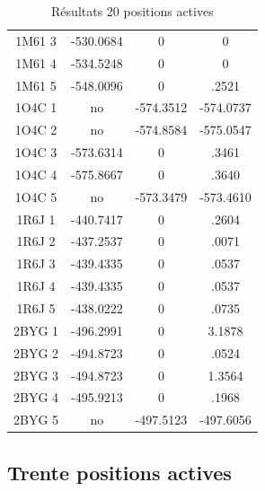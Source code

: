 \documentclass[a4paper,12pt]{article}
\begin{document}
\begin{table}[h]
\begin{tabular}{|c|c|c|c|}
        1M61 3 & -530.0684 & 0 & 0 \\
        1M61 4 & -534.5248 & 0 & 0 \\
        1M61 5 & -548.0096 & 0 & .2521 \\
        1O4C 1 & no & -574.3512 & -574.0737 \\
        1O4C 2 & no & -574.8584 & -575.0547 \\
        1O4C 3 & -573.6314 & 0 & .3461 \\
        1O4C 4 & -575.8667 & 0 & .3640 \\
        1O4C 5 & no & -573.3479 & -573.4610 \\
        1R6J 1 & -440.7417 & 0 & .2604 \\
        1R6J 2 & -437.2537 & 0 & .0071  \\
        1R6J 3 & -439.4335 & 0 & .0537 \\
        1R6J 4 & -439.4335 & 0 & .0537 \\
        1R6J 5 & -438.0222 & 0 & .0735 \\
        2BYG 1 & -496.2991 & 0 & 3.1878 \\
        2BYG 2 & -494.8723 & 0 & .0524\\
        2BYG 3 & -494.8723 & 0 & 1.3564 \\
        2BYG 4 & -495.9213 & 0 & .1968 \\
        2BYG 5 & no & -497.5123 & -497.6056 \\
        
        \hline

 \end{tabular}      
 \caption{Résultats 20 positions actives }
 \label{tab_echec2BYG__1}      
\end{table}



   \subsection{ Trente positions actives}
\end{document}
